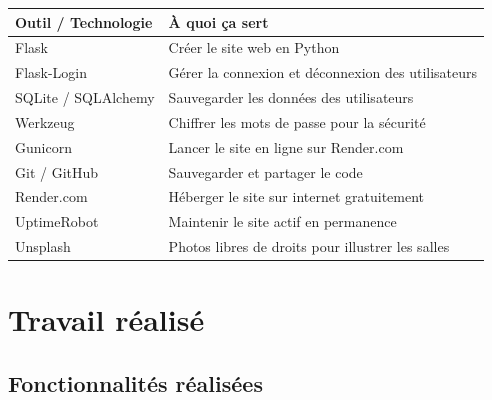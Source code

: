 \documentclass[a4paper, 12pt, twoside]{article}
\begin{document}
\begin{table}[h]
\begin{center}
\begin{tabular}{|l|l|}
\hline
\textbf{Outil / Technologie} & \textbf{À quoi ça sert} \\
\hline
Flask & Créer le site web en Python \\
\hline
Flask-Login & Gérer la connexion et déconnexion des utilisateurs \\
\hline
SQLite / SQLAlchemy & Sauvegarder les données des utilisateurs \\
\hline
Werkzeug & Chiffrer les mots de passe pour la sécurité \\
\hline
Gunicorn & Lancer le site en ligne sur Render.com \\
\hline
Git / GitHub & Sauvegarder et partager le code \\
\hline
Render.com & Héberger le site sur internet gratuitement \\
\hline
UptimeRobot & Maintenir le site actif en permanence \\
\hline
Unsplash & Photos libres de droits pour illustrer les salles \\
\hline
\end{tabular}
\end{center}

\end{table}

\section{Travail réalisé}

\subsection{Fonctionnalités réalisées}
\end{document}
